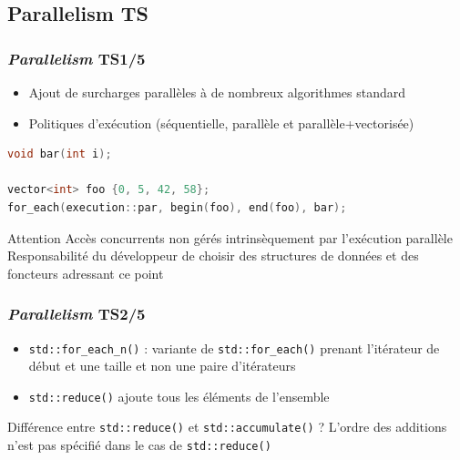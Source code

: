 \documentclass[C++.tex]{subfiles}
\begin{document}
\subsection*{Parallelism TS}
\begin{frame}[fragile]
	\frametitle{\textit{Parallelism} TS\titlehfill{}1/5}
	\begin{itemize}
		\item Ajout de surcharges \og parallèles\fg{} à de nombreux algorithmes standard
		\item Politiques d'exécution (séquentielle, parallèle et parallèle+vectorisée)
	\end{itemize}

	\begin{lstlisting}[language=C++]
void bar(int i);

vector<int> foo {0, 5, 42, 58};
for_each(execution::par, begin(foo), end(foo), bar);\end{lstlisting}

	\begin{alertblock}{Attention}
		Accès concurrents non gérés intrinsèquement par l'exécution parallèle\\
		Responsabilité du développeur de choisir des structures de données et des foncteurs adressant ce point
	\end{alertblock}
\end{frame}

\begin{frame}[fragile]
	\frametitle{\textit{Parallelism} TS\titlehfill{}2/5}
	\begin{itemize}
		\item \lstinline|std::for_each_n()| : variante de \lstinline|std::for_each()| prenant l'itérateur de début et une taille et non une paire d'itérateurs


		\item \lstinline|std::reduce()| \og ajoute\fg{} tous les éléments de l'ensemble
	\end{itemize}

	\begin{block}{Différence entre \lstinline|std::reduce()| et \lstinline|std::accumulate()| ?}
		L'ordre des \og additions\fg{} n'est pas spécifié dans le cas de \lstinline|std::reduce()|

	\end{block}
\end{frame}
\end{document}
